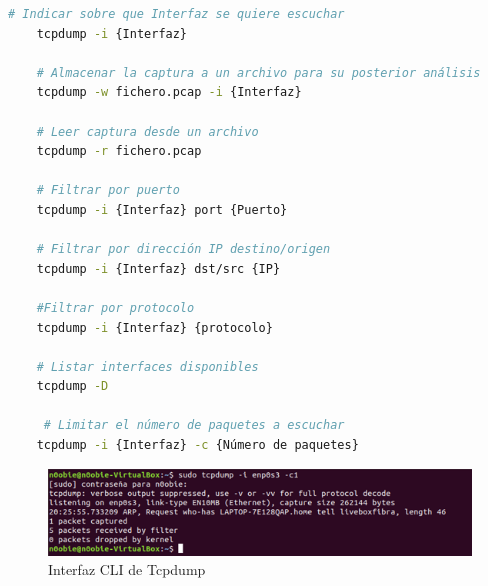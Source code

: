 \begin{lstlisting}[language= bash, style=Consola2, caption={Comandos útiles con Tcpdump},label=code:tcpdump_use]
    # Indicar sobre que Interfaz se quiere escuchar
    tcpdump -i {Interfaz}
    
    # Almacenar la captura a un archivo para su posterior análisis
    tcpdump -w fichero.pcap -i {Interfaz}
    
    # Leer captura desde un archivo
    tcpdump -r fichero.pcap
    
    # Filtrar por puerto
    tcpdump -i {Interfaz} port {Puerto}
    
    # Filtrar por dirección IP destino/origen
    tcpdump -i {Interfaz} dst/src {IP}
    
    #Filtrar por protocolo
    tcpdump -i {Interfaz} {protocolo}
    
    # Listar interfaces disponibles
    tcpdump -D
    
     # Limitar el número de paquetes a escuchar
    tcpdump -i {Interfaz} -c {Número de paquetes}
\end{lstlisting}
\vspace{1cm}
\begin{figure}[ht]
    \centering
    \includegraphics[width=14cm]{archivos/img/anexos/tcpdump_cli_edited.png}
    \caption{Interfaz CLI de Tcpdump}
    \label{tcpdumpCli}
\end{figure}

